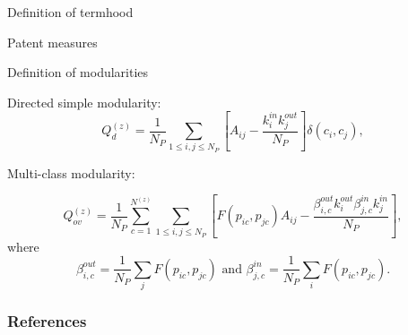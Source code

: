 \documentclass{beamer}
\begin{document}
\begin{frame}{Definition of termhood}
    
\end{frame}

\begin{frame}{Patent measures}
    
\end{frame}

\begin{frame}{Definition of modularities} \label{slide:modularity_def}
\hyperlink{slide:modularity}{}

    Directed simple modularity:
    \[
Q_d^{(z)} = \displaystyle \frac{1}{N_P}\sum_{1\leq i,j\leq N_P}\left[A_{ij} - \frac{k_{i}^{in}k_{j}^{out}}{N_P}\right]\delta(c_i,c_j),
\]


\bigskip

Multi-class modularity:

\[
\displaystyle Q_{ov}^{(z)} = \frac{1}{N_P} \sum_{c = 1}^{N^{(z)}} \sum_{1\leq i,j \leq N_P}\left[F(p_{ic},p_{jc})A_{ij} - \frac{\beta_{i,c}^{out}k_i^{out}\beta_{j,c}^{in}k_j^{in}}{N_P}\right],
\]
where
\[
 \beta_{i,c}^{out} =   \frac{1}{N_P} \displaystyle \sum_j F(p_{ic},p_{jc}) \text{ and } \beta_{j,c}^{in} =  \frac{1}{N_P} \displaystyle \sum_i F(p_{ic},p_{jc}).
\]
    
\end{frame}




\begin{frame}[allowframebreaks]
\frametitle{References}


\end{frame}
\end{document}
